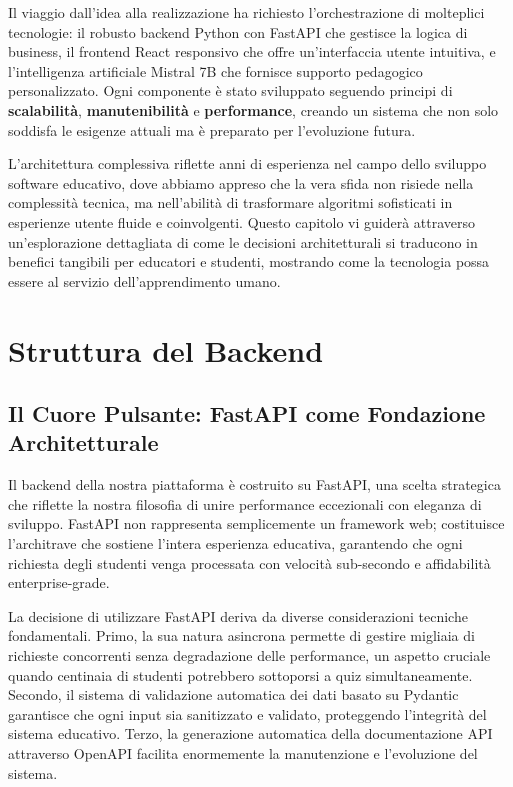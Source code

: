 \documentclass[a4paper, 14pt, oneside]{extbook}
\begin{document}
Il viaggio dall'idea alla realizzazione ha richiesto l'orchestrazione di molteplici tecnologie: il robusto backend Python con FastAPI che gestisce la logica di business, il frontend React responsivo che offre un'interfaccia utente intuitiva, e l'intelligenza artificiale Mistral 7B che fornisce supporto pedagogico personalizzato. Ogni componente è stato sviluppato seguendo principi di \textbf{scalabilità}, \textbf{manutenibilità} e \textbf{performance}, creando un sistema che non solo soddisfa le esigenze attuali ma è preparato per l'evoluzione futura.

L'architettura complessiva riflette anni di esperienza nel campo dello sviluppo software educativo, dove abbiamo appreso che la vera sfida non risiede nella complessità tecnica, ma nell'abilità di trasformare algoritmi sofisticati in esperienze utente fluide e coinvolgenti. Questo capitolo vi guiderà attraverso un'esplorazione dettagliata di come le decisioni architetturali si traducono in benefici tangibili per educatori e studenti, mostrando come la tecnologia possa essere al servizio dell'apprendimento umano.

\section{Struttura del Backend}

\subsection{Il Cuore Pulsante: FastAPI come Fondazione Architetturale}

Il backend della nostra piattaforma è costruito su FastAPI, una scelta strategica che riflette la nostra filosofia di unire performance eccezionali con eleganza di sviluppo. FastAPI non rappresenta semplicemente un framework web; costituisce l'architrave che sostiene l'intera esperienza educativa, garantendo che ogni richiesta degli studenti venga processata con velocità sub-secondo e affidabilità enterprise-grade.

La decisione di utilizzare FastAPI deriva da diverse considerazioni tecniche fondamentali. Primo, la sua natura asincrona permette di gestire migliaia di richieste concorrenti senza degradazione delle performance, un aspetto cruciale quando centinaia di studenti potrebbero sottoporsi a quiz simultaneamente. Secondo, il sistema di validazione automatica dei dati basato su Pydantic garantisce che ogni input sia sanitizzato e validato, proteggendo l'integrità del sistema educativo. Terzo, la generazione automatica della documentazione API attraverso OpenAPI facilita enormemente la manutenzione e l'evoluzione del sistema.
\end{document}
